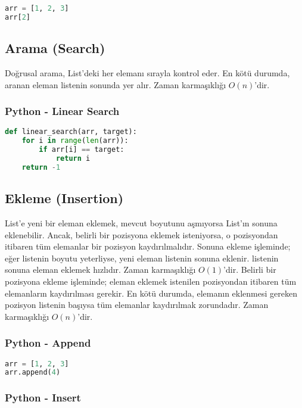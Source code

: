 \begin{lstlisting}[language=Python]
arr = [1, 2, 3]
arr[2]
\end{lstlisting}

\subsection{Arama (Search)}

Doğrusal arama, List'deki her elemanı sırayla kontrol eder. En kötü durumda, aranan eleman listenin sonunda yer alır. Zaman karmaşıklığı $O(n)$'dir.

\subsubsection{Python - Linear Search}

\begin{lstlisting}[language=Python]
def linear_search(arr, target):
    for i in range(len(arr)):
        if arr[i] == target:
            return i
    return -1
\end{lstlisting}

\subsection{Ekleme (Insertion)}

List'e yeni bir eleman eklemek, mevcut boyutunu aşmıyorsa List'ın sonuna eklenebilir. Ancak, belirli bir pozisyona eklemek isteniyorsa, o pozisyondan itibaren tüm elemanlar bir pozisyon kaydırılmalıdır. Sonuna ekleme işleminde; eğer listenin boyutu yeterliyse, yeni eleman listenin sonuna eklenir. listenin sonuna eleman eklemek hızlıdır. Zaman karmaşıklığı $O(1)$'dir. Belirli bir pozisyona ekleme işleminde; eleman eklemek istenilen pozisyondan itibaren tüm elemanların kaydırılması gerekir. En kötü durumda, elemanın eklenmesi gereken pozisyon listenin başıysa tüm elemanlar kaydırılmak zorundadır. Zaman karmaşıklığı $O(n)$'dir.

\subsubsection{Python - Append}

\begin{lstlisting}[language=Python]
arr = [1, 2, 3]
arr.append(4)
\end{lstlisting}

\subsubsection{Python - Insert}

